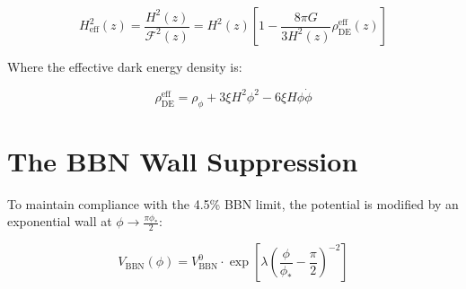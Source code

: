 \documentclass{article}
\begin{document}
\begin{equation}
H_{\text{eff}}^2(z) = \frac{H^2(z)}{\mathcal{F}^2(z)} = H^2(z) \left[ 1 - \frac{8\pi G}{3 H^2(z)} \rho_{\text{DE}}^{\text{eff}}(z) \right]
\end{equation}

Where the effective dark energy density is:

\begin{equation}
\rho_{\text{DE}}^{\text{eff}} = \rho_\phi + 3\xi H^2\phi^2 - 6\xi H\phi\dot{\phi}
\end{equation}

\section*{The BBN Wall Suppression}

To maintain compliance with the 4.5\% BBN limit, the potential is modified by an exponential wall at $\phi \to \frac{\pi\phi_*}{2}$:

\begin{equation}
V_{\text{BBN}}(\phi) = V_{\text{BBN}}^0 \cdot \exp \left[ \lambda \left( \frac{\phi}{\phi_*} - \frac{\pi}{2} \right)^{-2} \right]
\end{equation}
\end{document}
